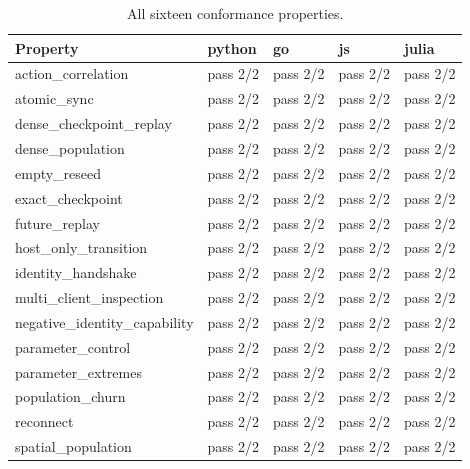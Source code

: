 \begin{table}[htbp]
\centering
\small
\caption{All sixteen conformance properties.}
\label{tab:conformance-full}
\begin{tabularx}{\linewidth}{>{\raggedright\arraybackslash}X>{\raggedright\arraybackslash}X>{\raggedright\arraybackslash}X>{\raggedright\arraybackslash}X>{\raggedright\arraybackslash}X}
\toprule
Property & python & go & js & julia \\
\midrule
action\_correlation & pass 2/2 & pass 2/2 & pass 2/2 & pass 2/2 \\
atomic\_sync & pass 2/2 & pass 2/2 & pass 2/2 & pass 2/2 \\
dense\_checkpoint\_replay & pass 2/2 & pass 2/2 & pass 2/2 & pass 2/2 \\
dense\_population & pass 2/2 & pass 2/2 & pass 2/2 & pass 2/2 \\
empty\_reseed & pass 2/2 & pass 2/2 & pass 2/2 & pass 2/2 \\
exact\_checkpoint & pass 2/2 & pass 2/2 & pass 2/2 & pass 2/2 \\
future\_replay & pass 2/2 & pass 2/2 & pass 2/2 & pass 2/2 \\
host\_only\_transition & pass 2/2 & pass 2/2 & pass 2/2 & pass 2/2 \\
identity\_handshake & pass 2/2 & pass 2/2 & pass 2/2 & pass 2/2 \\
multi\_client\_inspection & pass 2/2 & pass 2/2 & pass 2/2 & pass 2/2 \\
negative\_identity\_capability & pass 2/2 & pass 2/2 & pass 2/2 & pass 2/2 \\
parameter\_control & pass 2/2 & pass 2/2 & pass 2/2 & pass 2/2 \\
parameter\_extremes & pass 2/2 & pass 2/2 & pass 2/2 & pass 2/2 \\
population\_churn & pass 2/2 & pass 2/2 & pass 2/2 & pass 2/2 \\
reconnect & pass 2/2 & pass 2/2 & pass 2/2 & pass 2/2 \\
spatial\_population & pass 2/2 & pass 2/2 & pass 2/2 & pass 2/2 \\
\bottomrule
\end{tabularx}
\end{table}

